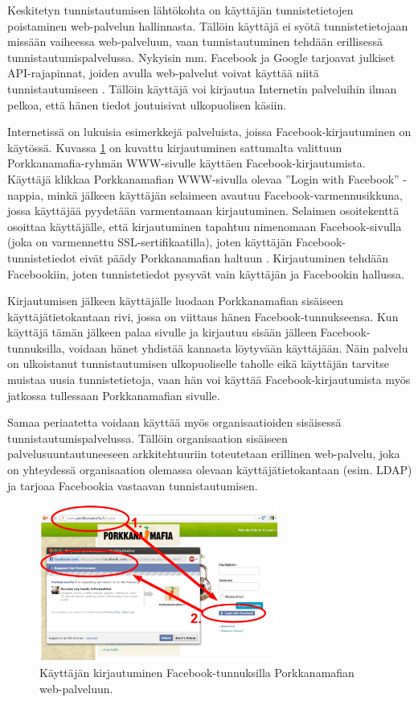 Keskitetyn tunnistautumisen lähtökohta on käyttäjän tunnistetietojen poistaminen web-palvelun hallinnasta. Tällöin käyttäjä ei syötä tunnistetietojaan missään vaiheessa web-palveluun, vaan tunnistautuminen tehdään erillisessä tunnistautumispalvelussa. Nykyisin mm. Facebook ja Google tarjoavat julkiset API-rajapinnat, joiden avulla web-palvelut voivat käyttää niitä tunnistautumiseen \cite{facebook}. Tällöin käyttäjä voi kirjautua Internetin palveluihin ilman pelkoa, että hänen tiedot joutuisivat ulkopuolisen käsiin.

Internetissä on lukuisia esimerkkejä palveluista, joissa Facebook-kirjautuminen on käytössä. Kuvassa \ref{facebook_login} on kuvattu kirjautuminen sattumalta valittuun Porkkanamafia-ryhmän WWW-sivulle käyttäen Facebook-kirjautumista. Käyttäjä klikkaa Porkkanamafian WWW-sivulla olevaa ''Login with Facebook'' -nappia, minkä jälkeen käyttäjän selaimeen avautuu Facebook-varmennusikkuna, jossa käyttäjää pyydetään varmentamaan kirjautuminen. Selaimen osoitekenttä osoittaa käyttäjälle, että kirjautuminen tapahtuu nimenomaan Facebook-sivulla (joka on varmennettu SSL-sertifikaatilla), joten käyttäjän Facebook-tun\-nis\-te\-tie\-dot eivät päädy Porkkanamafian haltuun \cite{facebook}. Kirjautuminen tehdään Facebookiin, joten tunnistetiedot pysyvät vain käyttäjän ja Facebookin hallussa.

Kirjautumisen jälkeen käyttäjälle luodaan Porkkanamafian sisäiseen käyttäjätietokantaan rivi, jossa on viittaus hänen Facebook-tunnukseensa. Kun käyttäjä tämän jälkeen palaa sivulle ja kirjautuu sisään jälleen Facebook-tunnuksilla, voidaan hänet yhdistää kannasta löytyvään käyttäjään. Näin palvelu on ulkoistanut tunnistautumisen ulkopuoliselle taholle eikä käyttäjän tarvitse muistaa uusia tunnistetietoja, vaan hän voi käyttää Facebook-kirjautumista myös jatkossa tullessaan Porkkanamafian sivulle.

Samaa periaatetta voidaan käyttää myös organisaatioiden sisäisessä tunnistautumispalvelussa. Tällöin organisaation sisäiseen palvelusuuntautuneeseen arkkitehtuuriin toteutetaan erillinen web-palvelu, joka on yhteydessä organisaation olemassa olevaan käyttäjätietokantaan (esim. LDAP) ja tarjoaa Facebookia vastaavan tunnistautumisen.

\begin{figure}[ht]
\centering
\includegraphics[width=0.7\textwidth]{tunnistautuminen/keskitetty/facebook.eps}
\caption{Käyttäjän kirjautuminen Facebook-tunnuksilla Porkkanamafian web-palveluun.}%
\label{facebook_login}
\end{figure}